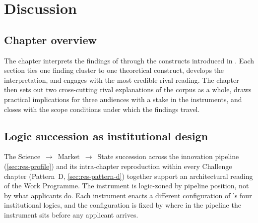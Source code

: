 %
\chapter{Discussion}
\label{ch:discussion}

\section*{Chapter overview}

The chapter interprets the findings of  through the
constructs introduced in . Each section ties one
finding cluster to one theoretical construct, develops the
interpretation, and engages with the most credible rival reading. The
chapter then sets out two cross-cutting rival explanations of the
corpus as a whole, draws practical implications for three audiences
with a stake in the instruments, and closes with the scope conditions
under which the findings travel.

\section{Logic succession as institutional design}
\label{sec:disc-succession}

The Science~$\to$~Market~$\to$~State succession across the innovation
pipeline (\cref{sec:res-profile}) and its intra-chapter reproduction
within every Challenge chapter (Pattern~D, \cref{sec:res-pattern-d})
together support an architectural reading of the Work Programme. The
instrument is logic-zoned by pipeline position, not by what applicants
do. Each instrument enacts a different configuration of
\textcite{thornton2012institutional}'s four institutional logics, and
the configuration is fixed by where in the pipeline the instrument
sits before any applicant arrives.

